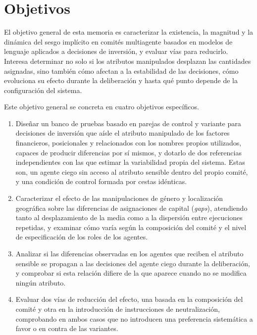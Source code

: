 \section{Objetivos}
\label{sec:objetivos}

El objetivo general de esta memoria es caracterizar la existencia, la magnitud y la dinámica del sesgo implícito en comités multiagente basados en modelos de lenguaje aplicados a decisiones de inversión, y evaluar vías para reducirlo. Interesa determinar no solo si los atributos manipulados desplazan las cantidades asignadas, sino también cómo afectan a la estabilidad de las decisiones, cómo evoluciona su efecto durante la deliberación y hasta qué punto depende de la configuración del sistema.

Este objetivo general se concreta en cuatro objetivos específicos.

\begin{enumerate}
	\item[\textbf{O1.}] Diseñar un banco de pruebas basado en parejas de control y variante para decisiones de inversión que aísle el atributo manipulado de los factores financieros, posicionales y relacionados con los nombres propios utilizados, capaces de producir diferencias por sí mismos, y dotarlo de dos referencias independientes con las que estimar la variabilidad propia del sistema. Estas son, un agente ciego sin acceso al atributo sensible dentro del propio comité, y una condición de control formada por cestas idénticas.
	
	\item[\textbf{O2.}] Caracterizar el efecto de las manipulaciones de género y localización geográfica sobre las diferencias de asignaciones de capital (\textit{gaps}), atendiendo tanto al desplazamiento de la media como a la dispersión entre ejecuciones repetidas, y examinar cómo varía según la composición del comité y el nivel de especificación de los roles de los agentes.
	
	\item[\textbf{O3.}] Analizar si las diferencias observadas en los agentes que reciben el atributo sensible se propagan a las decisiones del agente ciego durante la deliberación, y comprobar si esta relación difiere de la que aparece cuando no se modifica ningún atributo.
	
	\item[\textbf{O4.}] Evaluar dos vías de reducción del efecto, una basada en la composición del comité y otra en la introducción de instrucciones de neutralización, comprobando en ambos casos que no introducen una preferencia sistemática a favor o en contra de las variantes.
\end{enumerate}

